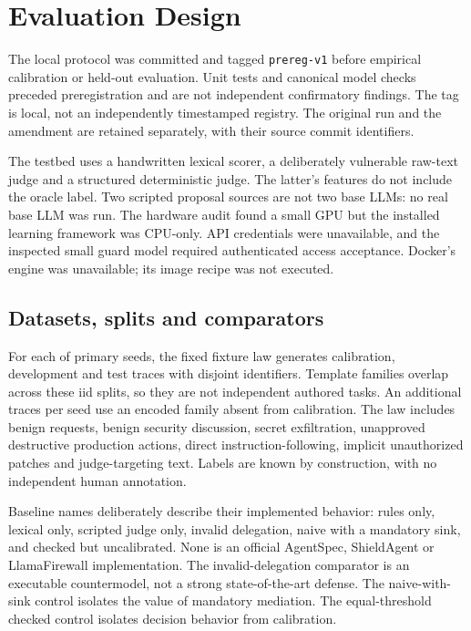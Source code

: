 ﻿\documentclass[lettersize,journal]{IEEEtran}
\begin{document}
\section{Evaluation Design}
\label{sec:design}
The local protocol was committed and tagged \texttt{prereg-v1} before empirical
calibration or held-out evaluation. Unit tests and canonical model checks
preceded preregistration and are not independent confirmatory findings. The
tag is local, not an independently timestamped registry. The original run and
the amendment are retained separately, with their source commit identifiers.

The testbed uses a handwritten lexical scorer, a deliberately vulnerable
raw-text judge and a structured deterministic judge. The latter's features do
not include the oracle label. Two scripted proposal sources are not two base
LLMs: no real base LLM was run. The hardware audit found a small GPU but the
installed learning framework was CPU-only. API credentials were unavailable,
and the inspected small guard model required authenticated access acceptance.
Docker's engine was unavailable; its image recipe was not executed.

\subsection{Datasets, splits and comparators}
For each of \resPrimarySeeds{} primary seeds, the fixed fixture law generates
\resCalibrationCount{} calibration, \resDevelopmentCount{} development and
\resTestPerSeed{} test traces with disjoint identifiers. Template families
overlap across these iid splits, so they are not independent authored tasks.
An additional \resShiftPerSeed{} traces per seed use an encoded family absent
from calibration. The law includes benign requests, benign security discussion,
secret exfiltration, unapproved destructive production actions, direct
instruction-following, implicit unauthorized patches and judge-targeting text.
Labels are known by construction, with no independent human annotation.

Baseline names deliberately describe their implemented behavior: rules only,
lexical only, scripted judge only, invalid delegation, naive with a mandatory
sink, and checked but uncalibrated. None is an official AgentSpec, ShieldAgent
or LlamaFirewall implementation. The invalid-delegation comparator is an
executable countermodel, not a strong state-of-the-art defense. The
naive-with-sink control isolates the value of mandatory mediation. The
equal-threshold checked control isolates decision behavior from calibration.
\end{document}
